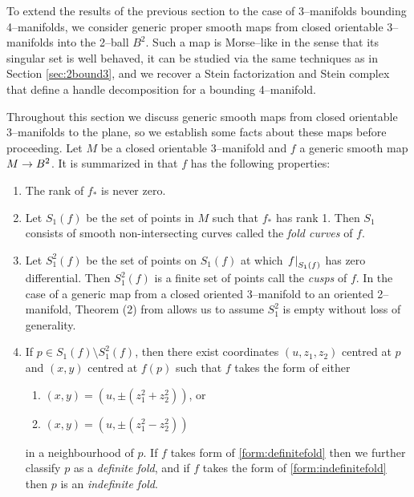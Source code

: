 \label{sec:3bound4}

%	
%
%
%
%

To extend the results of the previous section to the case of 3--manifolds bounding 4--manifolds, we consider generic proper smooth maps from closed orientable 3--manifolds into the 2--ball $B^2$.
Such a map is Morse--like in the sense that its singular set is well behaved, it can be studied via the same techniques as in Section \ref{sec:2bound3}, and we recover a Stein factorization and Stein complex that define a handle decomposition for a bounding 4--manifold.

Throughout this section we discuss generic smooth maps from closed orientable 3--manifolds to the plane, so we establish some facts about these maps before proceeding.
Let $M$ be a closed orientable 3--manifold and $f$ a generic smooth map $M\to B^2$.
It is summarized in \cite{Levine65} that $f$ has the following properties:
\begin{enumerate}
	\item
		The rank of $f_*$ is never zero.
	
	\item
		Let $S_1(f)$ be the set of points in $M$ such that $f_*$ has rank 1.
		Then $S_1$ consists of smooth non-intersecting curves called the \emph{fold curves} of $f$.
	
	\item
		Let $S_1^2(f)$ be the set of points on $S_1(f)$ at which $\left.f\right|_{S_1(f)}$ has zero differential.
		Then $S_1^2(f)$ is a finite set of points call the \emph{cusps} of $f$.
		In the case of a generic map from a closed oriented 3--manifold to an oriented 2--manifold, Theorem (2) from \cite{Levine65} allows us to assume $S_1^2$ is empty without loss of generality.
	
	\item
		If $p\in S_1(f)\setminus S_1^2(f)$, then there exist coordinates $(u,z_1,z_2)$ centred at $p$ and $(x,y)$ centred at $f(p)$ such that $f$ takes the form of either
		\begin{enumerate}
			\item \label{form:definitefold} $(x,y)=(u,\pm(z_1^2+z_2^2))$, or			
			\item \label{form:indefinitefold} $(x,y)=(u,\pm(z_1^2-z_2^2))$
		\end{enumerate}
		in a neighbourhood of $p$.
		If $f$ takes form of \ref{form:definitefold} then we further classify $p$ as a \emph{definite fold}, and if $f$ takes the form of \ref{form:indefinitefold} then $p$ is an \emph{indefinite fold}.
\end{enumerate}

